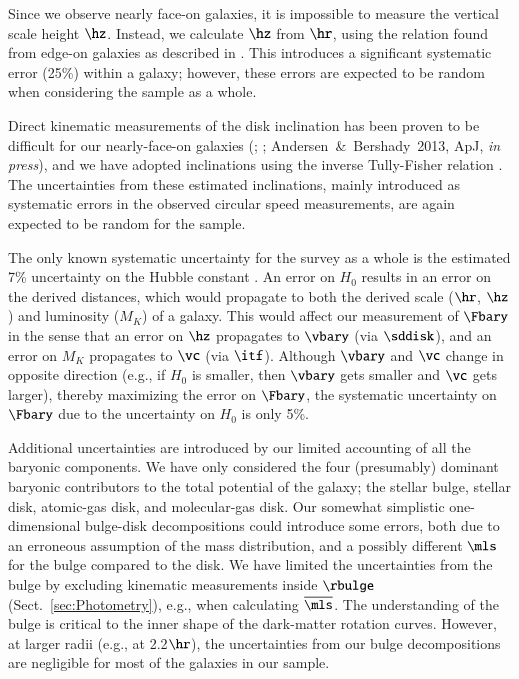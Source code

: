 \documentclass[traditabstract]{aa} %
\begin{document}
Since we observe nearly face-on galaxies, it is impossible to measure the vertical scale
height $\hz$. Instead, we calculate $\hz$ from $\hr$, using the relation found from
edge-on galaxies as described in . This introduces a significant
systematic error (25\%) within a galaxy; however, these errors are expected
to be random when considering the sample as a whole.

Direct kinematic measurements of the disk inclination has been proven to be difficult for
our nearly-face-on galaxies (\citealt{martinsson2011}; ;
Andersen~\&~Bershady~2013, ApJ, {\it in press}), and we have adopted inclinations using
the inverse Tully-Fisher relation . The uncertainties from
these estimated inclinations, mainly introduced as systematic errors in the observed 
circular speed measurements, are again expected to be random for the sample.

The only known systematic uncertainty for the survey as a whole is the estimated 7\%
uncertainty on the Hubble constant . An error on 
$H_0$ results in an error on the derived distances, which would propagate to both the
derived scale ($\hr$, $\hz$) and luminosity ($M_K$) of a galaxy. This would affect our
measurement of $\Fbary$ in the sense that an error on $\hz$ propagates to $\vbary$ (via
$\sddisk$), and an error on $M_K$ propagates to $\vc$ (via $\itf$). Although $\vbary$ and
$\vc$ change in opposite direction (e.g., if $H_0$ is smaller, then $\vbary$ gets smaller
and $\vc$ gets larger), thereby maximizing the error on $\Fbary$, the systematic
uncertainty on $\Fbary$ due to the uncertainty on $H_0$ is only 5\%.

Additional uncertainties are introduced by our limited accounting of all the baryonic 
components. We have only considered the four (presumably) dominant baryonic contributors
to the total potential of the galaxy; the stellar bulge, stellar disk, atomic-gas disk, 
and molecular-gas disk.
%
Our somewhat simplistic one-dimensional bulge-disk decompositions
 could introduce some errors, both due to an erroneous
assumption of the mass distribution, and a possibly different $\mls$ for the bulge 
compared to the disk. We have limited the uncertainties from the bulge by excluding 
kinematic measurements inside $\rbulge$ (Sect.~\ref{sec:Photometry}), e.g., when 
calculating $\overline{\mls}$. The understanding of the bulge is critical to the inner
shape of the dark-matter rotation curves. However, at larger radii (e.g., at 2.2$\hr$),
the uncertainties from our bulge decompositions are negligible for most of the galaxies
in our sample.
\end{document}
